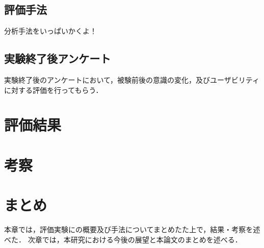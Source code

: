 \subsection{評価手法}
分析手法をいっぱいかくよ！

\subsection{実験終了後アンケート}
実験終了後のアンケートにおいて，被験前後の意識の変化，及びユーザビリティに対する評価を行ってもらう．%
\section{評価結果}
\section{考察}

\section{まとめ}
本章では，評価実験にの概要及び手法についてまとめたた上で，結果・考察を述べた．
次章では，本研究における今後の展望と本論文のまとめを述べる．
